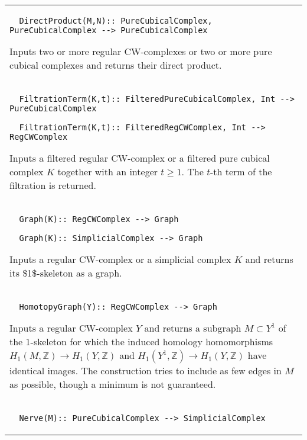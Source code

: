 \documentclass[a4paper,11pt]{report}
\begin{document}
{\begin{center}
\begin{tabular}{|l|}
\begin{verbatim}  DirectProduct(M,N):: PureCubicalComplex, PureCubicalComplex --> PureCubicalComplex
\end{verbatim}


 

 Inputs two or more regular CW-complexes or two or more pure cubical complexes
and returns their direct product. \\
 \index{FiltrationTerm} 
\begin{verbatim}  FiltrationTerm(K,t):: FilteredPureCubicalComplex, Int --> PureCubicalComplex
\end{verbatim}
 
\begin{verbatim}  FiltrationTerm(K,t):: FilteredRegCWComplex, Int --> RegCWComplex
\end{verbatim}
 

 

 Inputs a filtered regular CW-complex or a filtered pure cubical complex $K$ together with an integer $t \ge 1$. The $t$-th term of the filtration is returned. \\
 \index{Graph} 
\begin{verbatim}  Graph(K):: RegCWComplex --> Graph
\end{verbatim}
 
\begin{verbatim}  Graph(K):: SimplicialComplex --> Graph
\end{verbatim}


 

 Inputs a regular CW-complex or a simplicial complex $K$ and returns its \$1\$-skeleton as a graph. \\
 \index{HomotopyGraph} 
\begin{verbatim}  HomotopyGraph(Y):: RegCWComplex --> Graph
\end{verbatim}


 

 Inputs a regular CW-complex $Y$ and returns a subgraph $M \subset Y^1$ of the $1$-skeleton for which the induced homology homomorphisms $H_1(M,\mathbb Z) \rightarrow H_1(Y,\mathbb Z)$ and $H_1(Y^1,\mathbb Z) \rightarrow H_1(Y,\mathbb Z)$ have identical images. The construction tries to include as few edges in $M$ as possible, though a minimum is not guaranteed. \\
 \index{Nerve} 
\begin{verbatim}  Nerve(M):: PureCubicalComplex --> SimplicialComplex
\end{verbatim}
 

\end{tabular}
\end{center}}
\end{document}
